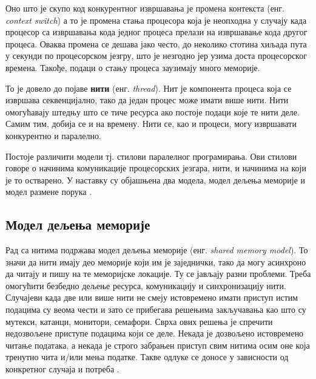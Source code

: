 \documentclass[12pt,oneside]{memoir}
\begin{document}
Оно што је скупо код конкурентног извршавања је промена контекста (енг. \textit{context switch}) а то је промена стања процесора која је неопходна у случају када процесор са извршавања кода једног процеса прелази на извршавање кода другог процеса. Оваква промена се дешава јако често, до неколико стотина хиљада пута у секунди по процесорском језгру,  што је незгодно јер узима доста процесорског времена. Такође, подаци о стању процеса заузимају много меморије.

То је довело до појаве \textbf{нити} (енг. \textit{thread}). Нит је компонента процеса која се извршава секвенцијално, тако да један процес може имати више нити. Нити омогућавају штедњу што се тиче ресурса ако постоје подаци које те нити деле. Самим тим, добија се и на времену. Нити се, као и процеси, могу извршавати конкурентно и паралелно.

Постоје различити модели тј. стилови паралелног програмирања. Ови стилови говоре о начинима комуникације процесорских језгара, нити, и начинима на који је то остварено. У наставку су објашњена два модела, модел дељења меморије и модел размене порука \cite{survey}.

\subsection{Модел дељења меморије}
Рад са нитима подржава модел дељења меморије (енг. \textit{shared memory model}). То значи да нити имају део меморије који им је заједнички, тако да могу асинхроно да читају и пишу на те меморијске локације. Ту се јављају разни проблеми. Треба омогућити безбедно дељење ресурса, комуникацију и синхронизацију нити.  Случајеви када две или више нити не смеју истовремено имати приступ истим подацима су веома чести и зато се прибегава решењима закључавања као што су мутекси, катанци, монитори, семафори. Сврха ових решења је спречити недозвољене приступе подацима који се деле. Некада је дозвољено истовремено читање података, а некада је строго забрањен приступ свим нитима осим оне која тренутно чита и/или мења податке. Такве одлуке се доносе у зависности од конкретног случаја и потреба \cite{progInScala3, survey}.
\end{document}

